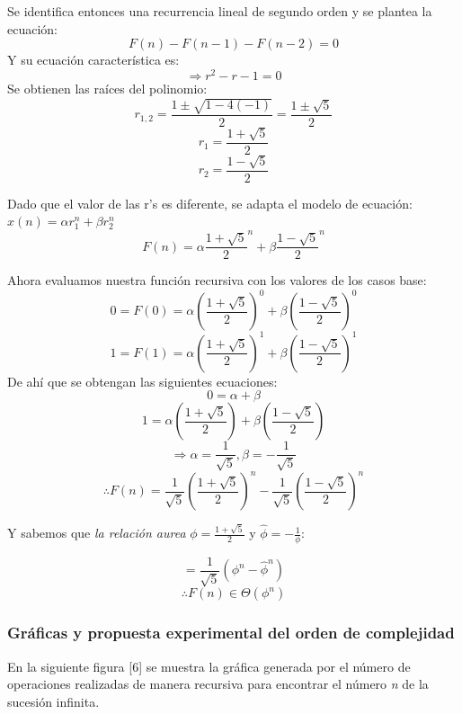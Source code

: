 \documentclass{report}
\begin{document}
            Se identifica entonces una recurrencia lineal de segundo orden y se plantea la ecuación: 
            $$F(n) - F(n-1) - F(n-2) = 0$$
            Y su ecuación característica es:
            $$\Rightarrow r^2-r-1=0$$
            Se obtienen las raíces del polinomio:
            $$r_{1,2} = \frac{1 \pm \sqrt{1 -4(-1)}}{2} = \frac{1 \pm \sqrt{5}}{2} $$
            $$r_1=\frac{1+\sqrt{5}}{2}$$
            $$r_2=\frac{1-\sqrt{5}}{2}$$
            
            Dado que el valor de las r's es diferente, se adapta el modelo de ecuación: $x(n)=\alpha r_1^n + \beta r_2^n$
            $$ F(n) = \alpha \frac{1+\sqrt{5}}{2}^n + \beta \frac{1-\sqrt{5}}{2}^n $$
            
            Ahora evaluamos nuestra función recursiva con los valores de los casos base:
            $$ 0 = F(0) = \alpha \left( \frac{1+\sqrt{5}}{2}\right)^0 + \beta\left( \frac{1-\sqrt{5}}{2}\right)^0 $$
            $$ 1 = F(1) = \alpha \left( \frac{1+\sqrt{5}}{2}\right)^1 + \beta\left( \frac{1-\sqrt{5}}{2}\right)^1 $$
            De ahí que se obtengan las siguientes ecuaciones:
            $$ 0 = \alpha + \beta $$
            $$ 1 =  \alpha \left( \frac{1+\sqrt{5}}{2}\right) + \beta\left( \frac{1-\sqrt{5}}{2}\right) $$
            $$ \Rightarrow \alpha = \frac{1}{\sqrt{5}} , \beta = -\frac{1}{\sqrt{5}} $$
            $$ \therefore F(n) = \frac{1}{\sqrt{5}}\left( \frac{1+\sqrt{5}}{2}\right)^n -\frac{1}{\sqrt{5}}\left( \frac{1-\sqrt{5}}{2}\right)^n $$
            
            Y sabemos que \textit{la relación aurea} $\phi = \frac{1+\sqrt{5}}{2}$ y $\hat{\phi} = -\frac{1}{\phi}$:
            
            $$ = \frac{1}{\sqrt{5}} \left(\phi ^n - \hat{\phi}^n \right)$$
            $$ \therefore F(n) \in \Theta (\phi ^n)$$
        
        \subsubsection*{Gráficas y propuesta experimental del orden de complejidad}
            En la siguiente figura [6] se muestra la gráfica generada por el número de operaciones realizadas de manera recursiva para encontrar el número \textit{n} de la sucesión infinita.
           
\end{document}
